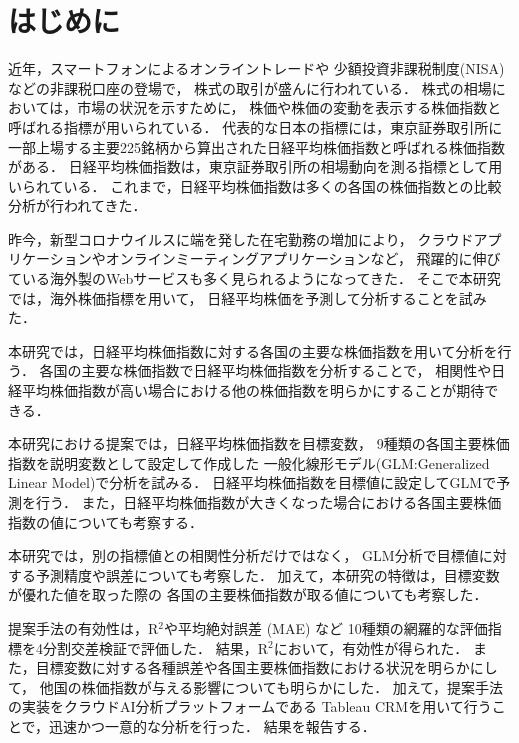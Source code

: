 \documentclass[submit,techrep,noauthor]{ipsj}
\begin{document}
\maketitle

\section{はじめに}
近年，スマートフォンによるオンライントレードや
少額投資非課税制度(NISA)などの非課税口座の登場で，
株式の取引が盛んに行われている．
%
株式の相場においては，市場の状況を示すために，
株価や株価の変動を表示する株価指数と呼ばれる指標が用いられている．
%
代表的な日本の指標には，東京証券取引所に一部上場する主要225銘柄から算出された日経平均株価指数と呼ばれる株価指数がある．
日経平均株価指数は，東京証券取引所の相場動向を測る指標として用いられている．
これまで，日経平均株価指数は多くの各国の株価指数との比較分析が行われてきた．

\newpage
昨今，新型コロナウイルスに端を発した在宅勤務の増加により，
クラウドアプリケーションやオンラインミーティングアプリケーションなど，
飛躍的に伸びている海外製のWebサービスも多く見られるようになってきた．
%
そこで本研究では，海外株価指標を用いて，
日経平均株価を予測して分析することを試みた．

本研究では，日経平均株価指数に対する各国の主要な株価指数を用いて分析を行う．
各国の主要な株価指数で日経平均株価指数を分析することで，
相関性や日経平均株価指数が高い場合における他の株価指数を明らかにすることが期待できる．


本研究における提案では，日経平均株価指数を目標変数，
9種類の各国主要株価指数を説明変数として設定して作成した
一般化線形モデル(GLM:Generalized Linear Model)で分析を試みる．
%
日経平均株価指数を目標値に設定してGLMで予測を行う．
また，日経平均株価指数が大きくなった場合における各国主要株価指数の値についても考察する．

\newpage
本研究では，別の指標値との相関性分析だけではなく，
GLM分析で目標値に対する予測精度や誤差についても考察した．
加えて，本研究の特徴は，目標変数が優れた値を取った際の
各国の主要株価指数が取る値についても考察した．

提案手法の有効性は，R$^2$や平均絶対誤差 (MAE) など
10種類の網羅的な評価指標を4分割交差検証で評価した．
結果，R$^2$において，有効性が得られた．
また，目標変数に対する各種誤差や各国主要株価指数における状況を明らかにして，
他国の株価指数が与える影響についても明らかにした．
%
加えて，提案手法の実装をクラウドAI分析プラットフォームである
Tableau CRMを用いて行うことで，迅速かつ一意的な分析を行った．
結果を報告する．
\end{document}
